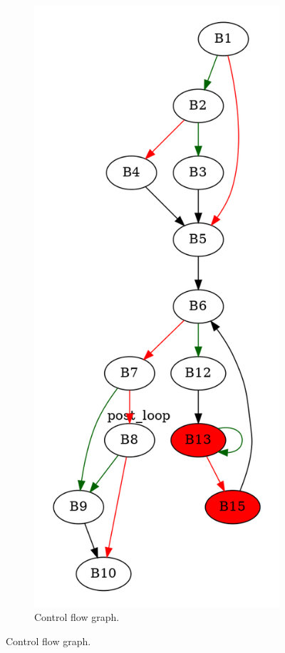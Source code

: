 \documentclass[aspectratio=1610]{beamer}
\begin{document}
\begin{frame}[noframenumbering]
\begin{figure}[htbp]
\begin{subfigure}[b]{0.50\textwidth}
			\includegraphics[height=0.7\paperheight]{inc/methods/hammock/counter-example/jump-threading-and-short-circuit/jump-threading-and-short-circuit_jump/f_0001a.png}
			\caption{Control flow graph.}
		\end{subfigure}
	\end{figure}
\end{frame}
\end{document}
